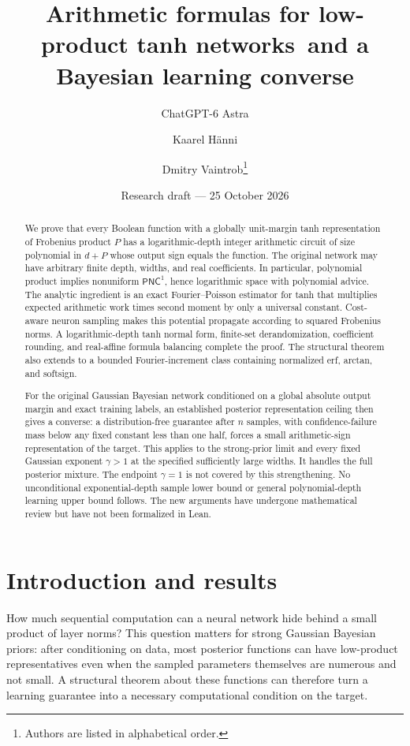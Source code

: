 \documentclass[11pt]{article}
\title{Arithmetic formulas for low-product tanh networks\
and a Bayesian learning converse}
\author{ChatGPT-6 Astra \and Kaarel H\"anni \and Dmitry Vaintrob\thanks{Authors are listed in alphabetical order.}}
\date{Research draft --- 25 October 2026}
\theoremstyle{remark}\newtheorem{remark}[theorem]{Remark}
\newcommand{\PNC}{\mathsf{PNC}}
\begin{document}
\maketitle
\begin{abstract}
We prove that every Boolean function with a globally unit-margin tanh
representation of Frobenius product $P$ has a logarithmic-depth integer
arithmetic circuit of size polynomial in $d+P$ whose output sign equals
the function. The original network may have arbitrary finite depth,
widths, and real coefficients. In particular, polynomial product implies
nonuniform $\PNC^1$, hence logarithmic space with polynomial advice.
The analytic ingredient is an exact Fourier--Poisson estimator for tanh
that multiplies expected arithmetic work times second moment by only a
universal constant. Cost-aware neuron sampling makes this potential
propagate according to squared Frobenius norms. A logarithmic-depth tanh
normal form, finite-set derandomization, coefficient rounding, and
real-affine formula balancing complete the proof.
The structural theorem also extends to a bounded Fourier-increment
class containing normalized erf, arctan, and softsign.

For the original Gaussian Bayesian network conditioned on a global
absolute output margin and exact training labels, an established
posterior representation ceiling then gives a converse: a
distribution-free guarantee after $n$ samples, with confidence-failure
mass below any fixed constant less than one half, forces a small
arithmetic-sign representation of the target. This applies to the
strong-prior limit and every fixed Gaussian exponent $\gamma>1$ at the
specified sufficiently large widths. It handles the full posterior
mixture. The endpoint $\gamma=1$ is not covered by this strengthening.
No unconditional exponential-depth sample lower bound or general
polynomial-depth learning upper bound follows. The new arguments have
undergone mathematical review but have not been formalized in Lean.
\end{abstract}

\section{Introduction and results}

How much sequential computation can a neural network hide behind a
small product of layer norms? This question matters for strong Gaussian
Bayesian priors: after conditioning on data, most posterior functions
can have low-product representatives even when the sampled parameters
themselves are numerous and not small. A structural theorem about these
functions can therefore turn a learning guarantee into a necessary
computational condition on the target.
\end{document}
